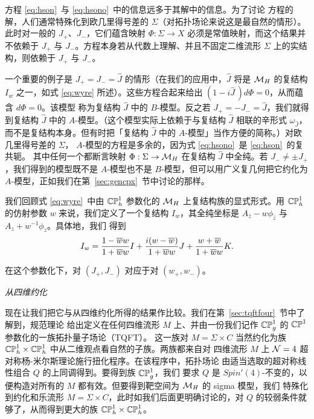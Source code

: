 方程 \eqref{eq:hson}\ 与 \eqref{eq:hsono}\ 中的信息远多于其解中的信息。为了讨论
方程的解，人们通常特殊化到欧几里得号差的 $\Sigma$（对拓扑场论来说这是最自然的情形）。
此时对一般的 $J_+$、$J_-$，它们蕴含映射
$\Phi:\Sigma\to X$ 必须是常值映射，而这个结果并不依赖于
$J_+$ 与 $J_-$。方程本身若从代数上理解、并且不固定二维流形
$\Sigma$ 上的实结构，则依赖于 $J_+$ 与 $J_-$。

一个重要的例子是 $J_+=J_-=\hat J$ 的情形（在我们的应用中，$\hat J$ 将是 $\MH$ 的复结构 $I_w$
之一，如式 \eqref{eq:wyre} 所述）。这些方程合起来给出
$(1-i\hat J\,)d\Phi = 0$，从而蕴含 $d\Phi=0$。该模型
称为复结构 $\hat J$ 中的 $B$-模型。反之若
$J_+=-J_-=\hat J$，我们就得到复结构 $\hat J$ 中的 $A$-模型。（这个模型实际上依赖于与复结构 $\hat J$ 相联的辛形式
$\omega_{\hat J}$，而不是复结构本身。但有时把「复结构 $\hat J$ 中的 $A$-模型」当作方便的简称。）对欧几里得号差的 $\Sigma$，
$A$-模型的方程是多余的，因为式 \eqref{eq:hsono}\ 是 \eqref{eq:hson}\ 的复共轭。
其中任何一个都断言映射 $\Phi:\Sigma\to \MH$ 在复结构 $\hat
J$ 中全纯。若 $J_-\not= \pm J_+$，我们得到的模型既不是
$A$-模型也不是 $B$-模型，但可以用广义复几何把它约化为 $A$-模型，正如我们在第~\ref{sec:gencpx}~节中讨论的那样。

我们回顾式 \eqref{eq:wyre}\ 中由 $\Bbb{CP}_h^1$ 参数化的 $\MH$ 上复结构族的显式形式。用
$\Bbb{CP}_h^1$ 的仿射参数 $w$ 来说，我们定义了一个复结构 $I_w$，其全纯坐标是
$A_{\bar z}-w\phi_{\bar z}$ 与 $A_z+w^{-1}\phi_z$。具体地，我们
得到 %
\setcounter{equation}{6}
\begin{equation}\label{eq:wyrre}
I_w={1-\bar w w\over 1+\bar w w}I+{i(w-\bar
w)\over 1+\bar w w}J+{w+\bar w\over 1+\bar w w}K.
\end{equation}

 在这个参数化下，对
$(J_+,J_-)$ 对应于对
$(w_+,w_-)$。

\par\medskip\emph{从四维约化}

现在让我们把它与从四维约化所得的结果作比较。我们在第~\ref{sec:tqftfour}~节中了解到，规范理论
给出定义在任何四维流形 $M$ 上、并由一份我们记作
$\Bbb{CP}^1_g$ 的 $\Bbb{CP}^1$ 参数化的一族拓扑量子场论（TQFT）。
这一族对 $M=\Sigma\times C$ 当然约化为族
$\Bbb{CP}_h^1\times \Bbb{CP}_h^1$ 中从二维观点看自然的子族。两族都来自对
四维流形 $M$ 上 ${\EUN}=4$ 超对称杨-米尔斯理论施行扭化程序。在该程序中，拓扑场论
由适当选取的超对称线性组合 $Q$ 的上同调得到。要得到族 $\Bbb{CP}^1_g$，我们
要求 $Q$ 是 $Spin'(4)$-不变的，以便构造对所有的 $M$ 都有效。但要得到靶空间为 $\MH$ 的 sigma 模型，我们
特殊化到约化和乐流形 $M=\Sigma\times C$，此时如我们后面更明确讨论的，对 $Q$ 的较弱条件就够了，从而得到更大的族 $\Bbb{CP}_h^1\times
\Bbb{CP}_h^1$。

